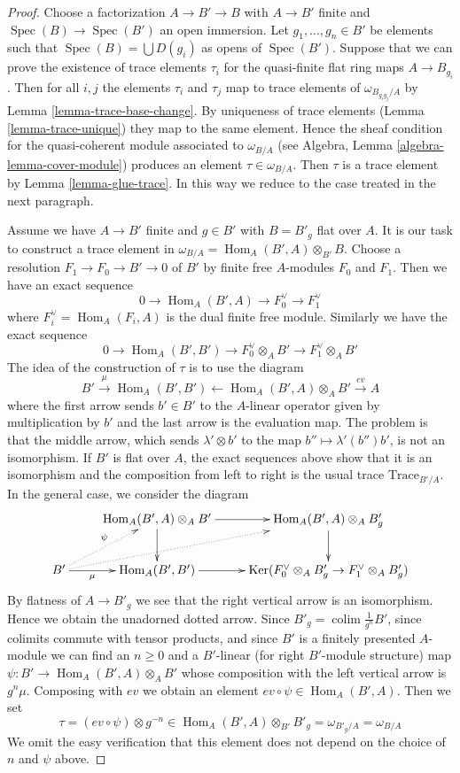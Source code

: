 \documentclass{stacks-project}
\theoremstyle{plain}
\theoremstyle{definition}
\theoremstyle{remark}
\numberwithin{equation}{subsection}
\def\colim{\mathop{\mathrm{colim}}\nolimits}
\def\Spec{\mathop{\mathrm{Spec}}}
\def\Hom{\mathop{\mathrm{Hom}}\nolimits}
\def\Ker{\mathop{\mathrm{Ker}}}
\begin{document}
\begin{proof}
Choose a factorization $A \to B' \to B$ with $A \to B'$ finite and
$\Spec(B) \to \Spec(B')$ an open immersion. Let $g_1, \ldots, g_n \in B'$
be elements such that $\Spec(B) = \bigcup D(g_i)$ as opens of $\Spec(B')$.
Suppose that we can prove the existence of trace elements $\tau_i$ for the
quasi-finite flat ring maps $A \to B_{g_i}$. Then for all $i, j$ the elements
$\tau_i$ and $\tau_j$ map to trace elements of $\omega_{B_{g_ig_j}/A}$
by Lemma \ref{lemma-trace-base-change}. By uniqueness of
trace elements (Lemma \ref{lemma-trace-unique}) they map to the same element.
Hence the sheaf condition for the quasi-coherent module associated to
$\omega_{B/A}$ (see Algebra, Lemma \ref{algebra-lemma-cover-module})
produces an element $\tau \in \omega_{B/A}$.
Then $\tau$ is a trace element by
Lemma \ref{lemma-glue-trace}.
In this way we reduce to the case treated in the next paragraph.

\medskip\noindent
Assume we have $A \to B'$ finite and $g \in B'$ with $B = B'_g$ flat over $A$.
It is our task to construct a trace element in
$\omega_{B/A} = \Hom_A(B', A) \otimes_{B'} B$.
Choose a resolution $F_1 \to F_0 \to B' \to 0$ of $B'$ by finite free
$A$-modules $F_0$ and $F_1$. Then we have an exact sequence
$$
0 \to \Hom_A(B', A) \to F_0^\vee \to F_1^\vee
$$
where $F_i^\vee = \Hom_A(F_i, A)$ is the dual finite free module.
Similarly we have the exact sequence
$$
0 \to \Hom_A(B', B') \to F_0^\vee \otimes_A B' \to F_1^\vee \otimes_A B'
$$
The idea of the construction of $\tau$ is to use the diagram
$$
B' \xrightarrow{\mu} \Hom_A(B', B')
\leftarrow \Hom_A(B', A) \otimes_A B'
\xrightarrow{ev} A
$$
where the first arrow sends $b' \in B'$ to the $A$-linear operator
given by multiplication by $b'$ and the last arrow is the evaluation map.
The problem is that the middle arrow, which sends $\lambda' \otimes b'$
to the map $b'' \mapsto \lambda'(b'')b'$, is not an isomorphism.
If $B'$ is flat over $A$, the exact sequences above show that it
is an isomorphism and the composition from left to right is the usual trace
$\text{Trace}_{B'/A}$. In the general case, we consider
the diagram
$$
\xymatrix{
& \Hom_A(B', A) \otimes_A B' \ar[r] \ar[d] &
\Hom_A(B', A) \otimes_A B'_g \ar[d] \\
B' \ar[r]_-\mu \ar@{..>}[rru] \ar@{..>}[ru]^\psi &
\Hom_A(B', B') \ar[r] &
\Ker(F_0^\vee \otimes_A B'_g \to F_1^\vee \otimes_A B'_g)
}
$$
By flatness of $A \to B'_g$ we see that the right vertical arrow is an
isomorphism. Hence we obtain the unadorned dotted arrow.
Since $B'_g = \colim \frac{1}{g^n}B'$, since
colimits commute with tensor products,
and since $B'$ is a finitely presented $A$-module
we can find an $n \geq 0$ and a $B'$-linear (for right $B'$-module structure)
map $\psi : B' \to \Hom_A(B', A) \otimes_A B'$
whose composition with the left vertical arrow is $g^n\mu$.
Composing with $ev$ we obtain an element
$ev \circ \psi \in \Hom_A(B', A)$. Then we set 
$$
\tau = (ev \circ \psi) \otimes g^{-n} \in
\Hom_A(B', A) \otimes_{B'} B'_g = \omega_{B'_g/A} = \omega_{B/A}
$$
We omit the easy verification that this element does not depend
on the choice of $n$ and $\psi$ above.


\end{proof}
\end{document}
